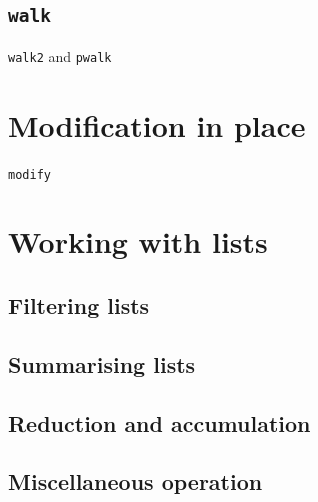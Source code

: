\documentclass[]{book}
\begin{document}
\hypertarget{walk}{%
\subsection{\texorpdfstring{\texttt{walk}}{walk}}\label{walk}}

\texttt{walk2} and \texttt{pwalk}

\hypertarget{modification-in-place}{%
\section{Modification in place}\label{modification-in-place}}

\texttt{modify}

\hypertarget{working-with-lists}{%
\section{Working with lists}\label{working-with-lists}}

\hypertarget{filtering-lists}{%
\subsection{Filtering lists}\label{filtering-lists}}

\hypertarget{summarising-lists}{%
\subsection{Summarising lists}\label{summarising-lists}}

\hypertarget{reduction-and-accumulation}{%
\subsection{Reduction and accumulation}\label{reduction-and-accumulation}}

\hypertarget{miscellaneous-operation}{%
\subsection{Miscellaneous operation}\label{miscellaneous-operation}}
\end{document}
